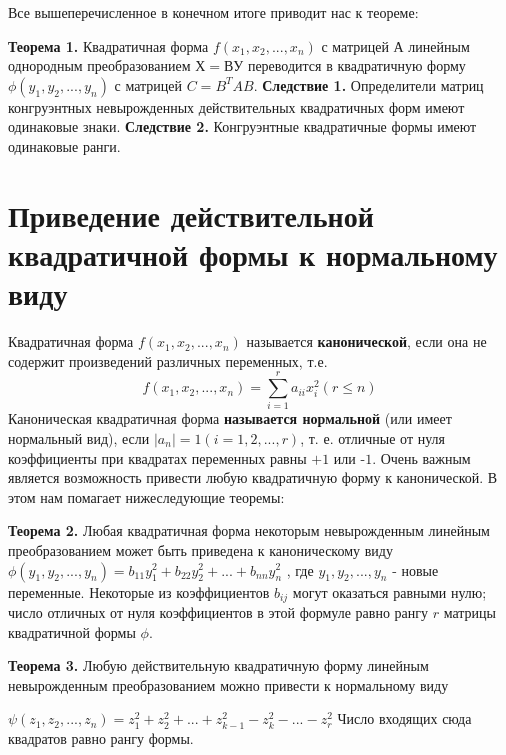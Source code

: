 \documentclass[bachelor, och, coursework, times]{SCWorks}
\newcommand\tab[1][1cm]{\hspace*{#1}}
\newcommand{\udsum}[3]{\sum\limits_{#1}^{#2}{#3}}
\newcommand{\tl}{\newline\tab}
\begin{document}
Все вышеперечисленное в конечном итоге приводит нас к теореме:

\textbf{Теорема 1.} Квадратичная форма $f(x_1, x_2,...,x_n)$ с матрицей $А$ линейным однородным преобразованием $Х = ВУ$ переводится в квадратичную форму $\phi(y_1, y_2,...,y_n)$ с матрицей $C=B^{T}AB$.
\tl
\textbf{Следствие 1.} Определители матриц конгруэнтных невырожденных действительных квадратичных форм имеют одинаковые знаки.
\tl
\textbf{Следствие 2.} Конгруэнтные квадратичные формы имеют одинаковые ранги.

\section{Приведение действительной квадратичной формы к нормальному виду}
\tab Квадратичная форма $f(x_1,x_2,...,x_n)$ называется \textbf{канонической}, если она не содержит произведений различных переменных, т.е. $$f(x_1,x_2,...,x_n)=\udsum{i=1}{r}{a_{ii}x_i^2} (r \le n)$$
\tl
Каноническая квадратичная форма \textbf{называется нормальной} (или имеет нормальный вид), если $|a_n| = 1 ( i= 1, 2, . . . , r)$, т. е. отличные от нуля коэффициенты при квадратах переменных равны $+1$ или -$1$. 
\tl
Очень важным является возможность привести любую квадратичную форму к канонической. В этом нам помагает нижеследующие теоремы:

\textbf{Теорема 2.} Любая квадратичная форма некоторым невырожденным линейным преобразованием может быть приведена к каноническому виду \newline $\phi(y_1,y_2,...,y_n)=b_{11}y_1^2+b_{22}y_2^2+...+b_{nn}y_n^2$ , где $y_1,y_2,...,y_n$ - новые переменные.
\tl
Некоторые из коэффициентов $b_{ij}$ могут оказаться равными нулю; число отличных от нуля коэффициентов в этой формуле равно рангу $r$ матрицы квадратичной формы $\phi$. 

\textbf{Теорема 3.} Любую действительную квадратичную форму линейным невырожденным преобразованием можно привести к нормальному виду

$\psi(z_1,z_2,...,z_n)=z_1^2+z_2^2+...+z_{k-1}^2-z_k^2-...-z_r^2$
Число входящих сюда квадратов равно рангу формы.
\end{document}
